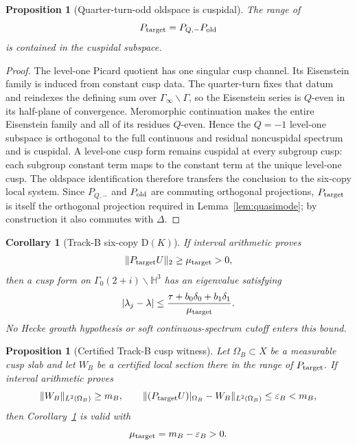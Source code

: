 \documentclass[11pt]{amsart}
\newtheorem{proposition}[theorem]{Proposition}
\newtheorem{corollary}[theorem]{Corollary}
\theoremstyle{definition}
\newcommand{\HH}{\mathbb H^3}
\newcommand{\G}{\Gamma}
\newcommand{\Hsub}{\Gamma_0(2+i)}
\newcommand{\norm}[1]{\lVert #1\rVert}
\newcommand{\abs}[1]{\lvert #1\rvert}
\newcommand{\D}{\Delta}
\begin{document}
\begin{proposition}[Quarter-turn-odd oldspace is cuspidal]\label{prop:odd}
The range of
\[
 P_{\rm target}=P_{Q,-}P_{\rm old}
\]
is contained in the cuspidal subspace.
\end{proposition}

\begin{proof}
The level-one Picard quotient has one singular cusp channel. Its Eisenstein
family is induced from constant cusp data. The quarter-turn fixes that datum
and reindexes the defining sum over $\G_\infty\backslash\G$, so the
Eisenstein series is $Q$-even in its half-plane of convergence. Meromorphic
continuation makes the entire Eisenstein family and all of its residues
$Q$-even. Hence the $Q=-1$ level-one subspace is orthogonal to the full
continuous and residual noncuspidal spectrum and is cuspidal. A level-one
cusp form remains cuspidal at every subgroup cusp: each subgroup constant
term maps to the constant term at the unique level-one cusp. The oldspace
identification therefore transfers the conclusion to the six-copy local
system. Since $P_{Q,-}$ and $P_{\rm old}$ are commuting orthogonal projections,
$P_{\rm target}$ is itself the orthogonal projection required in
Lemma~\ref{lem:quasimode}; by construction it also commutes with $\D$.
\end{proof}

\begin{corollary}[Track-B six-copy D$(K)$]\label{cor:target}
If interval arithmetic proves
\[
 \norm{P_{\rm target}U}_2\ge\mu_{\rm target}>0,
\]
then a cusp form on $\Hsub\backslash\HH$ has an eigenvalue satisfying
\begin{equation}\label{eq:targetbound}
 \abs{\lambda_j-\lambda}
 \le\frac{\tau+b_0\delta_0+b_1\delta_1}{\mu_{\rm target}}.
\end{equation}
No Hecke growth hypothesis or soft continuous-spectrum cutoff enters this
bound.
\end{corollary}

\begin{proposition}[Certified Track-B cusp witness]\label{prop:trackBwitness}
Let $\Omega_B\subset X$ be a measurable cusp slab and let $W_B$ be a
certified local section there in the range of $P_{\rm target}$. If interval
arithmetic proves
\[
 \norm{W_B}_{L^2(\Omega_B)}\ge m_B,
 \qquad
 \norm{(P_{\rm target}U)|_{\Omega_B}-W_B}_{L^2(\Omega_B)}
 \le\varepsilon_B<m_B,
\]
then Corollary~\ref{cor:target} is valid with
\begin{equation}\label{eq:trackBmass}
 \mu_{\rm target}=m_B-\varepsilon_B>0.
\end{equation}
\end{proposition}
\end{document}

